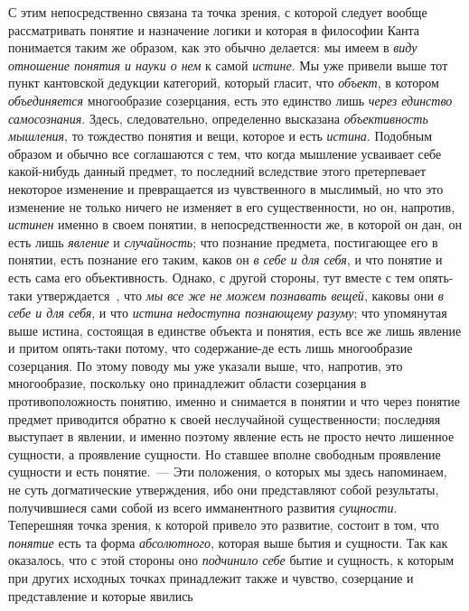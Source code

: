 \documentclass[twoside]{article}
\begin{document}
{{С этим непосредственно связана та точка зрения, с которой
следует вообще рассматривать понятие и назначение логики и которая в
философии Канта понимается таким же образом, как это обычно делается: мы
имеем в {\em виду отношение понятия и
науки о нем} к самой
{\em истине}. Мы уже
привели выше тот пункт кантовской дедукции категорий, который гласит, что
{\em объект}, в котором
{\em объединяется}
многообразие созерцания, есть это единство лишь
{\em через единство самосознания}.
Здесь, следовательно, определенно высказана
{\em объективность мышления},
то тождество понятия и вещи, которое и есть
{\em истина}. Подобным
образом и обычно все соглашаются с тем, что когда мышление усваивает себе
какой-нибудь данный предмет, то последний вследствие этого претерпевает
некоторое изменение и превращается из чувственного в мыслимый, но что это
изменение не только ничего не изменяет в его существенности, но он,
напротив, {\em истинен}
именно в своем понятии, в непосредственности же, в которой он
дан, он есть лишь {\em явление}
и {\em случайность};
что познание предмета, постигающее его в понятии, есть
познание его таким, каков он {\em в себе
и для себя}, и что понятие и есть сама его объективность.
Однако, с другой стороны, тут вместе с тем опять-таки
утверждается~\label{bkm:bm07},
что {\em мы все же не
можем познавать вещей}, каковы они
{\em в себе и для себя},
и что {\em истина
недоступна познающему разуму}; что упомянутая выше
истина, состоящая в единстве объекта и понятия, есть все же
лишь явление и притом опять-таки потому, что содержание-де есть лишь
многообразие созерцания. По этому поводу мы уже указали выше, что,
напротив, это многообразие, поскольку оно принадлежит области созерцания в
противоположность понятию, именно и снимается в понятии и что через понятие
предмет приводится обратно к своей неслучайной существенности; последняя
выступает в явлении, и именно поэтому явление есть не просто нечто лишенное
сущности, а проявление сущности. Но ставшее вполне свободным проявление
сущности и есть понятие.~— Эти положения, о которых мы здесь
напоминаем, не суть догматические утверждения, ибо они представляют собой
результаты, получившиеся сами собой из всего имманентного развития
{\em сущности}.
Теперешняя точка зрения, к которой привело это развитие,
состоит в том, что {\em понятие}
есть та форма
{\em абсолютного},
которая выше бытия и сущности. Так как оказалось, что с этой
стороны оно {\em подчинило себе}
бытие и сущность, к которым при других исходных точках
принадлежит также и чувство, созерцание и представление и которые явились
}}
\end{document}
